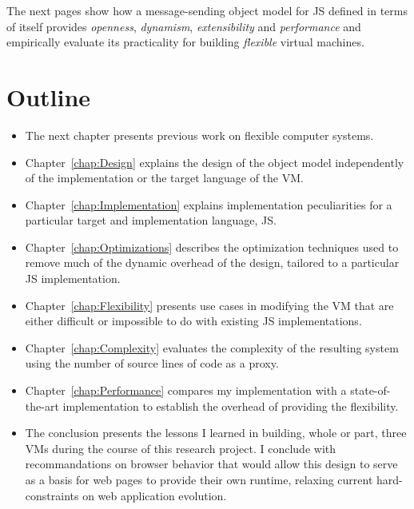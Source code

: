 The next pages show how a message-sending object model for JS defined in terms of
itself provides \textit{openness}, \textit{dynamism}, \textit{extensibility}
and \textit{performance} and empirically evaluate its practicality for building
\textit{flexible} virtual machines.

\section{Outline}
\begin{itemize}
    \item The next chapter presents previous work on flexible computer systems.
    \item Chapter~\ref{chap:Design} explains the design of the object model
    independently of the implementation or the target language of the VM.
    \item Chapter~\ref{chap:Implementation} explains implementation
    peculiarities for a particular target and implementation language, JS.
    \item Chapter~\ref{chap:Optimizations} describes the optimization
    techniques used to remove much of the dynamic overhead of the design,
    tailored to a particular JS implementation.  
    \item Chapter~\ref{chap:Flexibility} presents use cases in modifying the VM
    that are either difficult or impossible to do with existing JS
    implementations.
    \item Chapter~\ref{chap:Complexity} evaluates the complexity of the
    resulting system using the number of source lines of code as a proxy.
    \item Chapter~\ref{chap:Performance} compares my implementation with a
    state-of-the-art implementation to establish the overhead of providing the
    flexibility.  
    \item The conclusion presents the lessons I learned in building, whole or
    part, three VMs during the course of this research project. I conclude with
    recommandations on browser behavior that would allow this design to
    serve as a basis for web pages to provide their own runtime, relaxing
    current hard-constraints on web application evolution.
\end{itemize}
